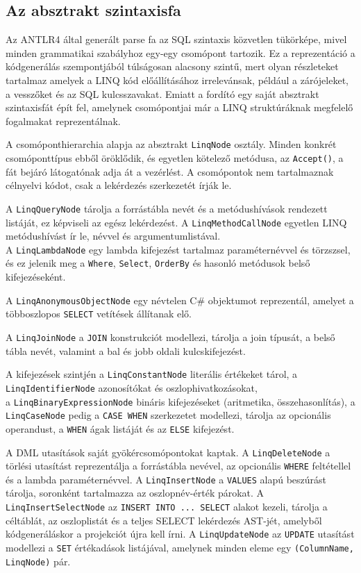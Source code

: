 \documentclass[a4paper,12pt]{article}
\begin{document}
\subsection{Az absztrakt szintaxisfa}

Az ANTLR4 által generált parse fa az SQL szintaxis közvetlen tükörképe, mivel minden grammatikai szabályhoz egy-egy csomópont tartozik. Ez a reprezentáció a kódgenerálás szempontjából túlságosan alacsony szintű, mert olyan részleteket tartalmaz amelyek a LINQ kód előállításához irrelevánsak, például a zárójeleket, a vesszőket és az SQL kulcsszavakat. Emiatt a fordító egy saját absztrakt szintaxisfát épít fel, amelynek csomópontjai már a LINQ struktúráknak megfelelő fogalmakat reprezentálnak.

A csomóponthierarchia alapja az absztrakt \texttt{LinqNode} osztály. Minden konkrét csomóponttípus ebből öröklődik, és egyetlen kötelező metódusa, az \texttt{Accept()}, a fát bejáró látogatónak adja át a vezérlést. A csomópontok nem tartalmaznak célnyelvi kódot, csak a lekérdezés szerkezetét írják le.

A \texttt{LinqQueryNode} tárolja a forrástábla nevét és a metódushívások rendezett listáját, ez képviseli az egész lekérdezést. A \texttt{LinqMethodCallNode} egyetlen LINQ metódushívást ír le, névvel és argumentumlistával. \\A \texttt{LinqLambdaNode} egy lambda kifejezést tartalmaz paraméternévvel és törzs\-zsel, és ez jelenik meg a \texttt{Where}, \texttt{Select}, \texttt{OrderBy} és hasonló metódusok belső kifejezéseként.

A \texttt{LinqAnonymousObjectNode} egy névtelen C\# objektumot reprezentál, amelyet a többoszlopos \texttt{SELECT} vetítések állítanak elő.

A \texttt{LinqJoinNode} a \texttt{JOIN} konstrukciót modellezi, tárolja a join típusát, a belső tábla nevét, valamint a bal és jobb oldali kulcskifejezést.

A kifejezések szintjén a \texttt{LinqConstantNode} literális értékeket tárol, a \texttt{LinqIdentifierNode} azonosítókat és oszlophivatkozásokat, \\a \texttt{LinqBinaryExpressionNode} bináris kifejezéseket (aritmetika, összehasonlítás), a \texttt{LinqCaseNode} pedig a \texttt{CASE WHEN} szerkezetet modellezi, tárolja az opcionális operandust, a \texttt{WHEN} ágak listáját és az \texttt{ELSE} kifejezést.

A DML utasítások saját gyökércsomópontokat kaptak. A \texttt{LinqDeleteNode} a törlési utasítást reprezentálja a forrástábla nevével, az opcionális \texttt{WHERE} feltétellel és a lambda paraméternévvel. A \texttt{LinqInsertNode} a \texttt{VALUES} alapú beszúrást tárolja, soronként tartalmazza az oszlopnév-érték párokat. A \texttt{LinqInsertSelectNode} az \texttt{INSERT INTO ... SELECT} alakot kezeli, tárolja a céltáblát, az oszloplistát és a teljes SELECT lekérdezés AST-jét, amelyből kódgeneráláskor a projekciót újra kell írni. A \texttt{LinqUpdateNode} az \texttt{UPDATE} utasítást modellezi a \texttt{SET} értékadások listájával, amelynek minden eleme egy \texttt{(ColumnName, LinqNode)} pár.
\end{document}
